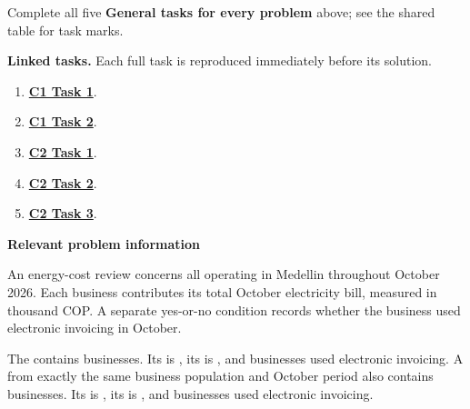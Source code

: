 Complete all five \textbf{General tasks for every problem} above; see the shared table for task marks.

\clearpage
\textbf{Linked tasks.} Each full task is reproduced immediately before its solution.

\begin{enumerate}[label=(\alph*),itemsep=6pt]
\item \hyperref[sol:p1c1a]{\textbf{C1 Task 1}}. \cOneA\ 
\item \hyperref[sol:p1c1b]{\textbf{C1 Task 2}}. \cOneB\ 
\item \hyperref[sol:p1c2a]{\textbf{C2 Task 1}}. \cTwoA\ 
\item \hyperref[sol:p1c2b]{\textbf{C2 Task 2}}. \cTwoB\ 
\item \hyperref[sol:p1c2c]{\textbf{C2 Task 3}}. \cTwoC\ 
\end{enumerate}
\secInicio[][sec:p1]

\clearpage



\textbf{Relevant problem information}

\begin{probleminfoexcerpt}
An energy-cost review concerns all     operating in Medellin throughout October 2026. Each business contributes its total October electricity bill, measured in thousand COP. A separate yes-or-no condition records whether the business used electronic invoicing in October.
\end{probleminfoexcerpt}

\begin{probleminfoexcerpt}
The     contains  businesses. Its   is   , its    is   , and  businesses used electronic invoicing. A     from exactly the same business population and October period also contains  businesses. Its   is   , its    is   , and  businesses used electronic invoicing.
\end{probleminfoexcerpt}


